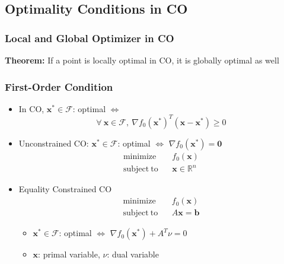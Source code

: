 \subsection{Optimality Conditions in CO}

\subsubsection*{Local and Global Optimizer in CO}
\textbf{Theorem:} If a point is locally optimal in CO, it is globally optimal as well

\subsubsection*{First-Order Condition}
\begin{itemize}
    \item In CO, $\mathbf{x}^{\ast} \in \mathcal{F}$: optimal $\Leftrightarrow$
    \begin{equation}
        \forall~\mathbf{x} \in \mathcal{F},~\nabla f_0 \left(\mathbf{x}^{\ast}\right)^T \left( \mathbf{x} - \mathbf{x}^{\ast} \right) \geq 0
    \end{equation}
    \item Unconstrained CO: $\mathbf{x}^{\ast} \in \mathcal{F}$: optimal
        $\Leftrightarrow$ $\nabla f_0 \left(\mathbf{x}^{\ast}\right) = \mathbf{0}$
    \begin{equation}\begin{aligned}
        \mathrm{minimize}~~&~~f_0(\mathbf{x}) \\
        \mathrm{subject~to}~~&~~\mathbf{x} \in \mathbb{R}^n
    \end{aligned}\end{equation}
    \item Equality Constrained CO
    \begin{equation}\begin{aligned}
        \mathrm{minimize}~~&~~f_0(\mathbf{x}) \\
        \mathrm{subject~to}~~&~~A\mathbf{x} = \mathbf{b}
    \end{aligned}\end{equation}
    \begin{itemize}
        \item $\mathbf{x}^{\ast} \in \mathcal{F}$: optimal $\Leftrightarrow$
            $\nabla f_0 \left(\mathbf{x}^{\ast}\right) + A^T \nu = 0$
        \item $\mathbf{x}$: primal variable, $\nu$: dual variable
    \end{itemize}

\end{itemize}
